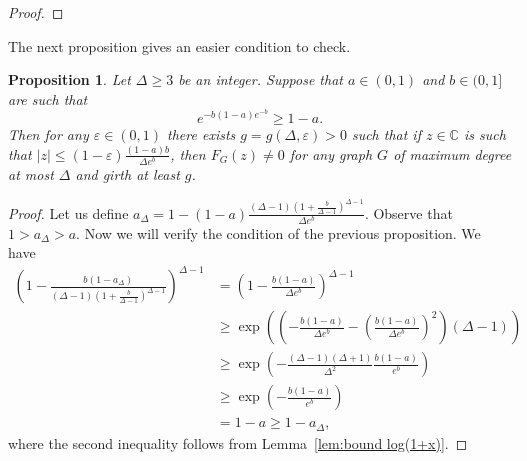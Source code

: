 \documentclass[a4paper,11pt,reqno]{amsart}
\newtheorem{proposition}[corollary]{Proposition}
\numberwithin{equation}{section}
\newcommand{\feri}[1]{{\bf \textcolor{red}{#1 - F}}}
\begin{document}
\begin{proof}


\end{proof}

The next proposition gives an easier condition to check.

\begin{proposition}
    Let $\Delta\ge 3$ be an integer. Suppose that $a\in (0,1)$ and $b\in(0,1]$ are such that
    \[
        e^{-b(1-a)e^{-b}}\ge 1-a.
    \]
    Then for any $\varepsilon\in(0,1)$ there exists $g=g(\Delta,\varepsilon)>0$ such that if $z\in\mathbb{C}$ is such that $|z|\le (1-\varepsilon)\frac{(1-a)b}{\Delta e^b}$, then $F_G(z)\neq 0$ for any graph $G$ of maximum degree at most $\Delta$ and girth at least $g$.
\end{proposition}
\begin{proof}
Let us define $a_\Delta=1-(1-a)\frac{(\Delta-1)(1+\tfrac{b}{\Delta-1})^{\Delta-1}}{\Delta e^b}$. Observe that $1>a_\Delta>a$. Now we will verify the condition of the previous proposition.
We have
\begin{align*}
    \left(1-\tfrac{b(1-a_\Delta)}{(\Delta-1)(1+\tfrac{b}{\Delta-1})^{\Delta-1}}\right)^{\Delta-1}&= (1-\tfrac{b(1-a)}{\Delta e^b})^{\Delta-1}
    \\
    &\ge \exp\left(\left(-\tfrac{b(1-a)}{\Delta e^b}-\left(\tfrac{b(1-a)}{\Delta e^b}\right)^2\right)(\Delta-1)\right)
    \\
    &\ge \exp\left(-\tfrac{(\Delta-1)(\Delta+1)}{\Delta^2}\tfrac{b(1-a)}{e^b}\right)\\
    &\ge \exp\left(-\tfrac{b(1-a)}{e^b}\right)\\
    &= 1-a\ge 1-a_\Delta,
\end{align*}
where the second inequality follows from Lemma~\ref{lem:bound log(1+x)}.
\end{proof}
\end{document}
